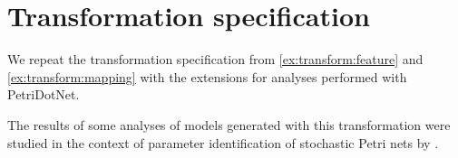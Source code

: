 \section{Transformation specification}

We repeat the transformation specification from \vref{ex:transform:feature} and \vref{ex:transform:mapping} with the extensions for analyses performed with PetriDotNet.

The results of some analyses of models generated with this transformation were studied in the context of parameter identification of stochastic Petri nets by \citet[Chapter~5]{Molnar17optimization}.

